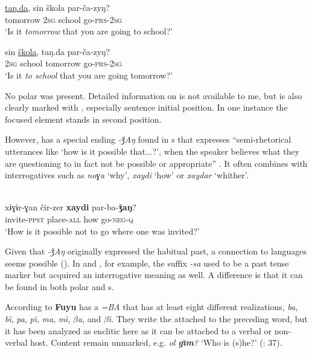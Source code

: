     \ex
    \gll \uline{taŋ.da},    sin    škola    par-ča-zyŋ?\\
    tomorrow  2\textsc{sg}    school    go-\textsc{prs}-2\textsc{sg}\\
    \glt ‘Is it \textit{tomorrow} that you are going to school?’
    
    \ex
    \gll sin    \uline{škola},    taŋ.da    par-ča-zyŋ?\\
    2\textsc{sg}    school    tomorrow  go-\textsc{prs}-2\textsc{sg}\\
    \glt ‘Is it \textit{to school} that you are going tomorrow?’\z\z

\noindent No polar  was present. Detailed information on  is not available to me, but  is also clearly marked with , especially sentence initial position. In one instance the focused element stands in second position.

However,  has a special  ending \textit{-ǯAŋ} found in s that expresses “semi-rhetorical utterances like ‘how is it possible that...?’, when the speaker believes what they are questioning to in fact not be possible or appropriate” \citep[38]{Anderson1998}. It often combines with interrogatives such as \textit{noɣa} ‘why’, \textit{xaydi} ‘how’ or \textit{xaydar} ‘whither’.

\ea%
    \label{ex:turk:50}
    \\
    \gll xɨɣɨr-ɣan  čir-zer \textbf{{xaydi}} par-ba-\textbf{{ǯaŋ}}?\\
    invite-\textsc{ppst}  place-\textsc{all}  how  go-\textsc{neg}-\textsc{q}\\
    \glt ‘How is it possible not to go where one was invited?’ \citep[38]{Anderson1998}
    \z

\noindent Given that \textit{-ǯAŋ} originally expressed the habitual past, a connection to  languages seems possible (). In  and , for example, the suffix \textit{-sa} used to be a past tense marker but acquired an interrogative meaning as well. A difference is that it can be found in both polar and s.

According to \citet[29]{HuImart1987} \textbf{Fuyu} has a  \textit{=BA} that has at least eight different realizations, \textit{ba}, \textit{b\u{\i}}, \textit{pa}, \textit{p\u{\i}}, \textit{ma}, \textit{m\u{\i}}, \textit{$\beta $a}, and \textit{$\beta $\u{\i}}. They write the  attached to the preceding word, but it has been analyzed as enclitic here as it can be attached to a verbal or non-verbal host. Content  remain unmarked, e.g. \textit{ol \textbf{g\u{\i}m}?} ‘Who is (s)he?’ (\citealt{HuImart1987}: 37).

